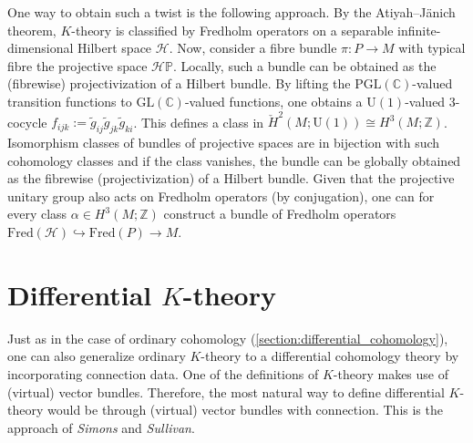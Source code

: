 {    One way to obtain such a twist is the following approach. By the Atiyah--J\"anich theorem, $K$-theory is classified by Fredholm operators on a separable infinite-dimensional Hilbert space $\mathcal{H}$. Now, consider a fibre bundle $\pi:P\rightarrow M$ with typical fibre the projective space $\mathcal{H}\mathbb{P}$. Locally, such a bundle can be obtained as the (fibrewise) projectivization of a Hilbert bundle. By lifting the $\mathrm{PGL}(\mathbb{C})$-valued transition functions to $\mathrm{GL}(\mathbb{C})$-valued functions, one obtains a $\mathrm{U}(1)$-valued 3-cocycle $f_{ijk}:=\widetilde{g}_{ij}\widetilde{g}_{jk}\widetilde{g}_{ki}$. This defines a class in $\check{H}^2(M;\mathrm{U}(1))\cong H^3(M;\mathbb{Z})$. Isomorphism classes of bundles of projective spaces are in bijection with such cohomology classes and if the class vanishes, the bundle can be globally obtained as the fibrewise (projectivization) of a Hilbert bundle. Given that the projective unitary group also acts on Fredholm operators (by conjugation), one can for every class $\alpha\in H^3(M;\mathbb{Z})$ construct a bundle of Fredholm operators $\mathrm{Fred}(\mathcal{H})\hookrightarrow\mathrm{Fred}(P)\rightarrow M$.


\section{\texorpdfstring{Differential $K$-theory}{Differential K-theory}}

    Just as in the case of ordinary cohomology (\cref{section:differential_cohomology}), one can also generalize ordinary $K$-theory to a differential cohomology theory by incorporating connection data. One of the definitions of $K$-theory makes use of (virtual) vector bundles. Therefore, the most natural way to define differential $K$-theory would be through (virtual) vector bundles with connection. This is the approach of \textit{Simons} and \textit{Sullivan}.

    }
